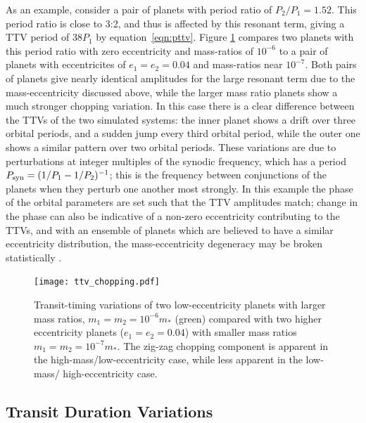 \documentclass[graybox,natbib,nosecnum]{svmult}
\begin{document}
As an example, consider a pair of planets with period ratio of $P_2/P_1 = 1.52$.  This period ratio
is close to 3:2, and thus is affected by this resonant term, giving a TTV period of $38 P_1$ by equation~\ref{eqn:pttv}.
Figure \ref{ttv_chopping} compares two planets with this period ratio with zero eccentricity
and mass-ratios of $10^{-6}$ to a pair of planets with eccentricites of $e_1=e_2=0.04$
and mass-ratios near $10^{-7}$.  Both pairs of planets give nearly identical amplitudes
for the large resonant term due to the mass-eccentricity discussed above, while the larger mass ratio planets show a 
much stronger chopping variation.  In this case there is a clear difference between the TTVs of the two simulated
systems:  the inner planet shows a drift over three orbital periods, and a sudden jump
every third orbital period, while the outer one shows a similar pattern over two orbital
periods.  These variations are due to perturbations at integer multiples of the synodic
frequency, which has a period $P_{\rm syn}= (1/P_1-1/P_2)^{-1}$; this is the frequency between conjunctions of
the planets when they perturb one another most strongly.  In this example the phase of the orbital parameters are set such that the TTV amplitudes match;  change
in the phase can also be indicative of a non-zero eccentricity contributing to the TTVs,
and with an ensemble of planets which are believed to have a similar eccentricity
distribution, the mass-eccentricity degeneracy may be broken statistically \citep{2012ApJ...761..122L,
2014ApJ...787...80H}.

\begin{figure}
\centerline{
\texttt{[image: ttv\_chopping.pdf]}}
%
\caption{Transit-timing variations of two low-eccentricity planets with larger
mass ratios, $m_1 = m_2 = 10^{-6} m_*$ (green) compared with two higher eccentricity planets ($e_1=e_2=0.04$)
with smaller mass ratios $m_1 = m_2 = 10^{-7} m_*$.  The zig-zag chopping component
is apparent in the high-mass/low-eccentricity case, while less apparent in the low-mass/
high-eccentricity case.}
\label{ttv_chopping}       %
\end{figure}




\subsection{Transit Duration Variations}
\end{document}
